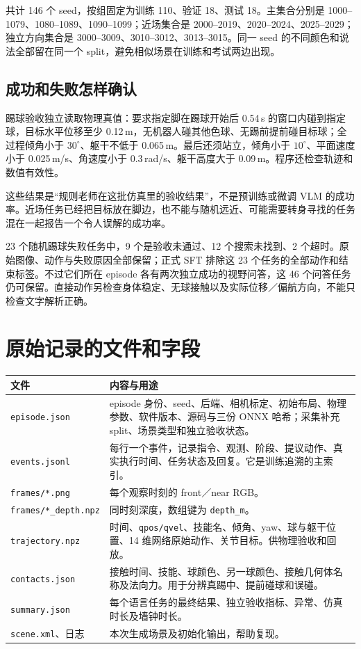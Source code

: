共计 146 个 seed，按组固定为训练 110、验证 18、测试 18。主集合分别是 1000--1079、1080--1089、1090--1099；近场集合是 2000--2019、2020--2024、2025--2029；独立方向集合是 3000--3009、3010--3012、3013--3015。同一 seed 的不同颜色和说法全部留在同一个 split，避免相似场景在训练和考试两边出现。

\subsection{成功和失败怎样确认}

踢球验收独立读取物理真值：要求指定脚在踢球开始后 0.54\,s 的窗口内碰到指定球，目标水平位移至少 0.12\,m，无机器人碰其他色球、无踢前提前碰目标球；全过程倾角小于 $30^\circ$、躯干不低于 0.065\,m。最后还须站立，倾角小于 $10^\circ$、平面速度小于 0.025\,m/s、角速度小于 0.3\,rad/s、躯干高度大于 0.09\,m。程序还检查轨迹和数值有效性。

这些结果是“规则老师在这批仿真里的验收结果”，不是预训练或微调 VLM 的成功率。近场任务已经把目标放在脚边，也不能与随机远近、可能需要转身寻找的任务混在一起报告一个令人误解的成功率。

23 个随机踢球失败任务中，9 个是验收未通过、12 个搜索未找到、2 个超时。原始图像、动作与失败原因全部保留；正式 SFT 排除这 23 个任务的全部动作和结束标签。不过它们所在 episode 各有两次独立成功的视野问答，这 46 个问答任务仍可保留。直接动作另检查身体稳定、无球接触以及实际位移／偏航方向，不能只检查文字解析正确。

\section{原始记录的文件和字段}

\begin{longtable}{P{4.0cm}P{10.6cm}}
\hline
文件 & 内容与用途\\
\hline
\endhead
\texttt{episode.json} & episode 身份、seed、后端、相机标定、初始布局、物理参数、软件版本、源码与三份 ONNX 哈希；采集补充 split、场景类型和独立验收状态。\\
\texttt{events.jsonl} & 每行一个事件，记录指令、观测、阶段、提议动作、真实执行时间、任务状态及回复。它是训练追溯的主索引。\\
\texttt{frames/*.png} & 每个观察时刻的 front／near RGB。\\
\texttt{frames/*\_depth.npz} & 同时刻深度，数组键为 \texttt{depth\_m}。\\
\texttt{trajectory.npz} & 时间、\texttt{qpos/qvel}、技能名、倾角、yaw、球与躯干位置、14 维网络原始动作、关节目标。供物理验收和回放。\\
\texttt{contacts.json} & 接触时间、技能、球颜色、另一球颜色、接触几何体名称及法向力。用于分辨真踢中、提前碰球和误碰。\\
\texttt{summary.json} & 每个语言任务的最终结果、独立验收指标、异常、仿真时长及墙钟时长。\\
\texttt{scene.xml}、日志 & 本次生成场景及初始化输出，帮助复现。\\
\hline
\end{longtable}

